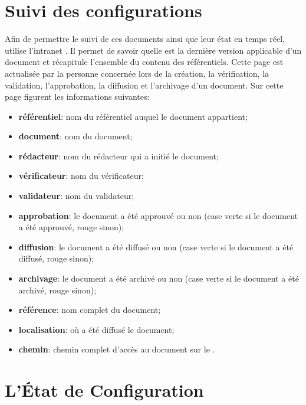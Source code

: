 \section{Suivi des configurations}

Afin de permettre le suivi de ces documents ainsi que leur état en temps réel, \nomEquipe{} utilise l'intranet \lintranet. 
Il permet de savoir quelle est la dernière version applicable d'un document et récapitule l'ensemble du contenu des référentiels. 
Cette page est actualisée par la personne concernée lors de la création, la vérification, la validation, l'approbation, la diffusion et l'archivage d'un 
document. 
Sur cette page figurent les informations suivantes:
\begin{itemize}
	\item \textbf{référentiel}: nom du référentiel auquel le document appartient;
	\item \textbf{document}: nom du document;
	\item \textbf{rédacteur}: nom du rédacteur qui a initié le document;
	\item \textbf{vérificateur}: nom du vérificateur;
	\item \textbf{validateur}: nom du validateur;
	\item \textbf{approbation}: le document a été approuvé ou non (case verte si le document a été
	approuvé, rouge sinon);
	\item \textbf{diffusion}: le document a été diffusé ou non (case verte si le document a été
	diffusé, rouge sinon);
	\item \textbf{archivage}: le document a été archivé ou non (case verte si le document a été
	archivé, rouge sinon);
	\item \textbf{référence}: nom complet du document;
	\item \textbf{localisation}: où a été diffusé le document;
	\item \textbf{chemin}: chemin complet d'accès au document sur le \git.
\end{itemize}


\section{L'État de Configuration}

